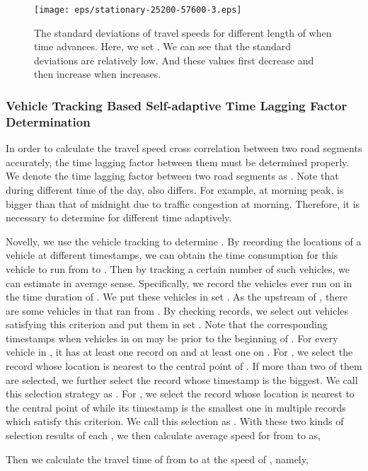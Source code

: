 \documentclass[twocolumn,10pt,final,conference]{IEEEtran}
\begin{document}
\begin{figure}[h]
\centering
{
\texttt{[image: eps/stationary-25200-57600-3.eps]}
}
\caption{The standard deviations of travel speeds for different length of  when time advances. Here, we set . We can see that the standard deviations are relatively low. And these values first decrease and then increase when  increases. }
\label{fig-OneCentralRoadsTS}
\end{figure}
\subsubsection{Vehicle Tracking Based Self-adaptive Time Lagging Factor Determination}\label{section-sub-Time Lagging}
\quad

In order to calculate the travel speed cross correlation between two road segments accurately, the time lagging factor  between them must be determined properly.
We denote the time lagging factor between two road segments  as . Note that during different time of the day,  also differs. For example, at morning peak,   is bigger than that of midnight due to traffic congestion at morning. Therefore, it is necessary to determine  for different time adaptively.

Novelly, we use the vehicle tracking to determine . By recording the locations of a vehicle at different timestamps, we can obtain the time consumption for this vehicle to run from  to . Then by tracking a certain number of such vehicles, we can estimate  in  average sense.
Specifically, we record the vehicles ever run on  in the time duration of . We put these vehicles in set . As the upstream of , there are some vehicles in  that ran from . By checking records, we select out vehicles satisfying this criterion and put them in set . Note that the corresponding timestamps when vehicles in  on  may be prior to the beginning of . For every vehicle  in , it has at least one record on  and at least one on . For , we select the record whose location is nearest to the central point of . If more than two of them are selected, we further select the record whose timestamp is the biggest. We call this selection strategy as . For , we select the record whose location is nearest to the central point of  while its timestamp is the smallest one in multiple records which satisfy this criterion. We call this selection as . With these two kinds of selection results of each , we then calculate average speed for  from  to  as,

Then we calculate the travel time of  from  to  at the speed of , namely,
\end{document}
